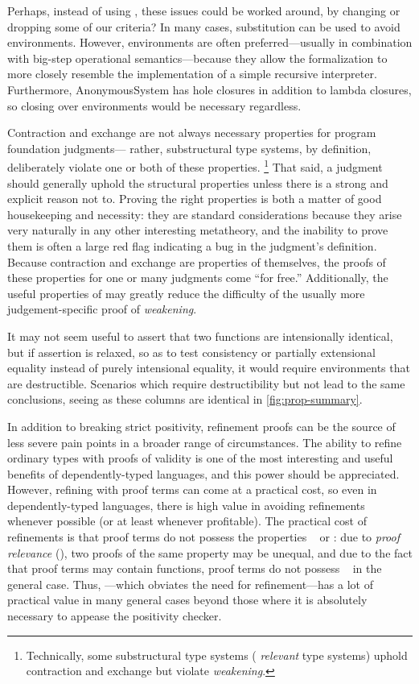 Perhaps, instead of using \dds, these issues could be worked around, by changing or dropping some of our criteria?
In many cases, substitution can be used to avoid environments. However, environments are often preferred---usually in combination with big-step operational semantics---because
they allow the formalization to more closely resemble the implementation of a simple recursive interpreter. Furthermore,
AnonymousSystem has hole closures in addition to lambda closures, so closing over environments would be necessary regardless.

Contraction and exchange are not always necessary properties for program foundation judgments---%
rather, substructural type systems, by definition, deliberately violate one or both of these properties.%
\footnote{\hspace{0.01in}Technically, some substructural type systems (\eg{} \emph{relevant} type systems) uphold contraction and exchange but violate \emph{weakening}.}
That said, a judgment should generally uphold the structural properties unless there is a strong and explicit
reason not to. Proving the right properties
is both a matter of good housekeeping and necessity: they are standard
considerations because they arise very naturally in any other
interesting metatheory, and the inability to prove them is often a large red flag indicating a bug in the judgment's definition.
Because contraction and exchange are properties of \dds{} themselves,
the proofs of these properties for one or many judgments come ``for free.''
Additionally, the useful properties of \dds{} may greatly reduce the difficulty of the usually
more judgement-specific proof of \emph{weakening}.

It may not seem useful to assert that two functions are intensionally identical, but if assertion is relaxed,
so as to test consistency or partially extensional equality instead of purely intensional equality,
it would require environments that are destructible.
Scenarios which require destructibility but not \EqDec{} lead to the same conclusions,
seeing as these columns are identical in \autoref{fig:prop-summary}.

In addition to breaking strict positivity, refinement proofs can be the source of less severe pain points in
a broader range of circumstances.
The ability to refine ordinary types with proofs of validity is one of the most interesting and useful benefits of
dependently-typed languages, and this power should be appreciated. However, refining with proof terms can
come at a practical cost, so even in dependently-typed languages, there is high value in avoiding refinements
whenever possible (or at least whenever profitable). The practical cost of refinements is that proof terms
do not possess the properties \SemInj~ or \EqDec: due to \emph{proof relevance} (), two proofs of
the same property may be unequal, and due to the fact that proof terms may contain functions, proof terms do not
possess \EqDec~ in the general case. Thus, \SemTot---which obviates the need for refinement---has
a lot of practical value in many general cases beyond those where it is absolutely necessary to appease the
positivity checker.

